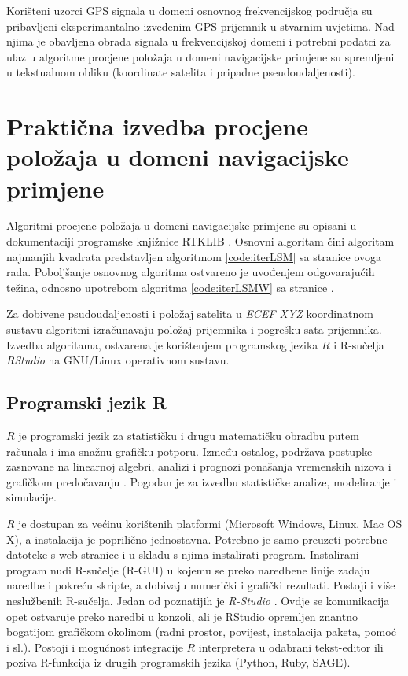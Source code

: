 \documentclass[a4paper,twoside,12pt]{memoir} %
\begin{document}
Korišteni uzorci GPS signala u domeni osnovnog frekvencijskog područja su pribavljeni eksperimantalno izvedenim GPS prijemnik u stvarnim uvjetima.
Nad njima je obavljena obrada signala u frekvencijskoj domeni i potrebni podatci za ulaz u 
algoritme procjene položaja u domeni navigacijske primjene su spremljeni u tekstualnom obliku (koordinate satelita i pripadne pseudoudaljenosti).

\chapter{Praktična izvedba procjene položaja u domeni navigacijske primjene}\label{sec:izvedba}
Algoritmi procjene položaja u domeni navigacijske primjene su opisani u dokumentaciji programske knjižnice RTKLIB \cite{ref:36}.
Osnovni algoritam čini algoritam najmanjih kvadrata predstavljen algoritmom \ref{code:iterLSM} sa \pageref{code:iterLSM} stranice ovoga rada. Poboljšanje osnovnog algoritma ostvareno je uvođenjem odgovarajućih težina, odnosno upotrebom algoritma \ref{code:iterLSMW} sa stranice \pageref{code:iterLSMW}.

Za dobivene psudoudaljenosti i 
položaj satelita u \textit{ECEF XYZ} koordinatnom sustavu algoritmi izračunavaju položaj
prijemnika i pogrešku sata prijemnika. Izvedba algoritama, ostvarena je korištenjem programskog jezika $R$ \cite{ref:24} i R-sučelja \textit{RStudio} na GNU/Linux operativnom sustavu.
\section{Programski jezik R}
$R$ je programski jezik za statističku i drugu matematičku obradbu putem računala i ima snažnu grafičku potporu.
Između ostalog, podržava postupke zasnovane na linearnoj algebri, analizi i prognozi ponašanja vremenskih nizova i grafičkom predočavanju \cite{ref:34,ref:22}.
Pogodan je za izvedbu statističke analize, modeliranje i simulacije.
 
 \textit{R} je dostupan za većinu korištenih platformi (Microsoft Windows, Linux, Mac OS X), a instalacija je poprilično jednostavna.
 Potrebno je samo preuzeti potrebne datoteke s web-stranice \cite{Rsite} i u skladu s njima instalirati program.
 Instalirani program nudi R-sučelje (R-GUI) u kojemu se preko naredbene linije zadaju naredbe i pokreću skripte, a dobivaju numerički i grafički rezultati.
 Postoji i više neslužbenih R-sučelja. Jedan od poznatijih je \textit{R-Studio} \cite{RStudio}.
 Ovdje se komunikacija opet ostvaruje preko naredbi u konzoli, ali je RStudio opremljen znantno bogatijom grafičkom okolinom (radni prostor, povijest, instalacija paketa, pomoć i sl.).
Postoji i mogućnost integracije $R$ interpretera u odabrani tekst-editor ili poziva R-funkcija iz drugih programskih jezika (Python, Ruby, SAGE).
\\
\end{document}
